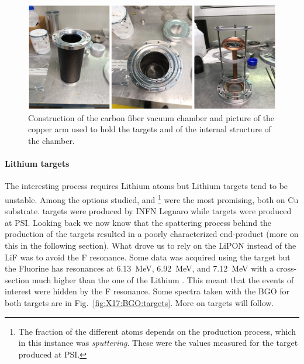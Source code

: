 \begin{refsection}
        \begin{figure}
            \centering
            \includegraphics[width=\linewidth]{Figures/X17/X17_holder.png}
            \caption[X17: Vacuum chamber and target mechanics]{Construction of the carbon fiber vacuum chamber and picture of the copper arm used to hold the targets and of the internal structure of the chamber.}
            \label{fig:X17:holder}
        \end{figure}
        
        \paragraph{Lithium targets}
        The interesting process requires Lithium atoms but Lithium targets tend to be unstable. 
        Among the options studied,  and \footnote{The fraction of the different atoms depends on the production process, which in this instance was \textit{sputtering}. These were the values measured for the target produced at PSI.} were the most promising, both on Cu substrate.
         targets were produced by INFN Legnaro while  targets were produced at PSI.
        Looking back we now know that the spattering process behind the production of the  targets resulted in a poorly characterized end-product (more on this in the following section).
        What drove us to rely on the LiPON instead of the LiF was to avoid the F resonance. 
        Some data was acquired using the  target but the Fluorine has resonances  at \SI{6.13}{MeV}, \SI{6.92}{MeV}, and \SI{7.12}{MeV} with a cross-section much higher than the one of the Lithium \cite{}.
        This meant that the events of interest were hidden by the F resonance.
        Some spectra taken with the BGO for both targets are in Fig.~\ref{fig:X17:BGO:targets}.
        More on targets will follow.


\end{refsection}
